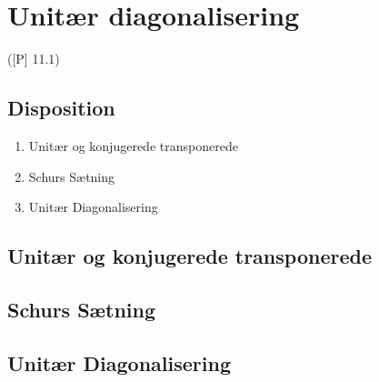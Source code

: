 \newpage
\chapter{Unitær diagonalisering}
([P] 11.1)

\section*{Disposition}
\begin{enumerate}
	\item Unitær og konjugerede transponerede
	\item Schurs Sætning
	\item Unitær Diagonalisering
\end{enumerate}

\section{Unitær og konjugerede transponerede}



\section{Schurs Sætning}


\section{Unitær Diagonalisering}

